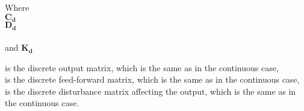 \begin{minipage}[t]{0.20\textwidth}
Where\\
\hspace*{8mm} $\bm{C_d}$ \\
\hspace*{8mm} $\bm{D_d}$ \\\\
and \hspace*{0.7mm} $\bm{K_d}$ 
\end{minipage}
\begin{minipage}[t]{0.78\textwidth}
\vspace*{2mm}
is the discrete output matrix, which is the same as in the continuous case, \\
is the discrete feed-forward matrix, which is the same as in the continuous case, \\
is the discrete disturbance matrix affecting the output, which is the same as in the continuous case. \\
\end{minipage}




